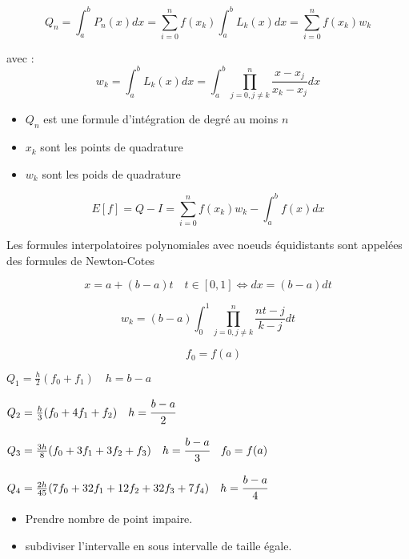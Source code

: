 \hformbar




$$Q_n = \int_{a}^{b} P_n(x) dx = \sum_{i=0}^{n} f(x_k) \int_{a}^{b} L_k(x) dx = \sum_{i=0}^{n} f(x_k) w_k$$

avec : $$w_k = \int_{a}^{b} L_k(x) dx = \int_{a}^{b} \prod_{j=0, j \neq k}^{n} \frac{x-x_j}{x_k-x_j} dx$$

\begin{itemize}
    \item $Q_n$ est une formule d'intégration de degré au moins $n$
    \item $x_k$ sont les points de quadrature
    \item $w_k$ sont les poids de quadrature
\end{itemize}

$$ E[f] = Q-I = \sum_{i=0}^{n} f(x_k) w_k - \int_{a}^{b} f(x) dx$$

\hformbar


Les formules interpolatoires polynomiales avec noeuds
équidistants sont appelées des formules de Newton-Cotes


$$x = a + (b-a)t \quad t \in [0,1] \Leftrightarrow dx = (b-a)dt$$

$$w_k = (b-a) \int_{0}^{1} \prod_{j=0, j \neq k}^{n} \frac{nt-j}{k-j} dt$$

$$\quad f_0 = f(a)$$


$Q_1 = \frac{h}{2} (f_0 + f_1) \quad h = b-a$


$Q_2 = \frac{h}{3} (f_0 + 4f_1 + f_2) \quad h = \cfrac{b-a}{2} $


$Q_3 = \frac{3h}{8} (f_0 + 3f_1 + 3f_2 + f_3) \quad h = \cfrac{b-a}{3} \quad f_0 = f(a)$


$Q_4 = \frac{2h}{45} (7f_0 + 32f_1 + 12f_2 + 32f_3 + 7f_4) \quad h = \cfrac{b-a}{4}$

\begin{itemize}
    \item Prendre nombre de point impaire.
    \item subdiviser l'intervalle en sous intervalle de taille égale.
\end{itemize}


